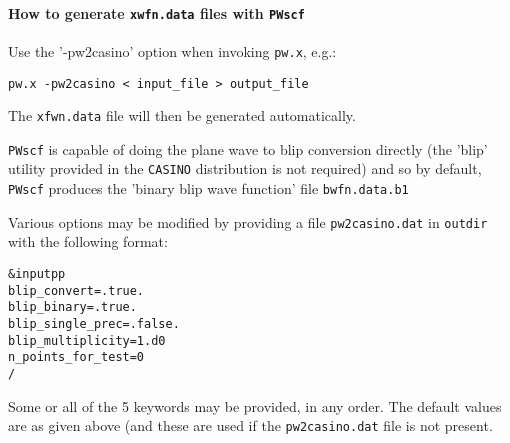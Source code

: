 \documentclass[12pt,a4paper]{article}
\begin{document}
\paragraph{How to generate \texttt{xwfn.data} files with \texttt{PWscf}}
Use the '-pw2casino' option when invoking \texttt{pw.x}, e.g.: 
\begin{verbatim}
pw.x -pw2casino < input_file > output_file
\end{verbatim}
The \texttt{xfwn.data} file will then be generated automatically. 

\texttt{PWscf} is capable of doing the plane wave to blip conversion directly (the
'blip' utility provided in the \texttt{CASINO} distribution is not required) and so by
default, \texttt{PWscf} produces the 'binary blip wave function' file \texttt{bwfn.data.b1}

Various options may be modified by providing a file \texttt{pw2casino.dat} in \texttt{outdir}
with the following format: 
\begin{verbatim}
&inputpp
blip_convert=.true.
blip_binary=.true.
blip_single_prec=.false.
blip_multiplicity=1.d0
n_points_for_test=0
/
\end{verbatim}
Some or all of the 5 keywords may be provided, in any order. The default
values are as given above (and these are used if the \texttt{pw2casino.dat} file is
not present.
\end{document}

